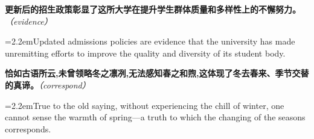 \documentclass[11pt,a4paper]{article}
\newcommand{\num}[1]{\makebox[1.9em][r]{#1.}\hspace{0.3em}}
\newcommand{\prompt}[1]{\emph{\textcolor{tipblue}{\small（#1）}}}
\begin{document}
\begin{minipage}{\linewidth}

\num{15}\textbf{更新后的招生政策彰显了这所大学在提升学生群体质量和多样性上的不懈努力。}\prompt{evidence}

\vspace{0.15em}

\noindent\hangindent=2.2em\hspace{2.2em}Updated admissions policies are evidence that the university has made unremitting efforts to improve the quality and diversity of its student body.

\end{minipage}

\begin{minipage}{\linewidth}

\num{16}\textbf{恰如古语所云,未曾领略冬之凛冽,无法感知春之和煦,这体现了冬去春来、季节交替的真谛。}\prompt{correspond}

\vspace{0.15em}

\noindent\hangindent=2.2em\hspace{2.2em}True to the old saying, without experiencing the chill of winter, one cannot sense the warmth of spring—a truth to which the changing of the seasons corresponds.

\end{minipage}
\end{document}
